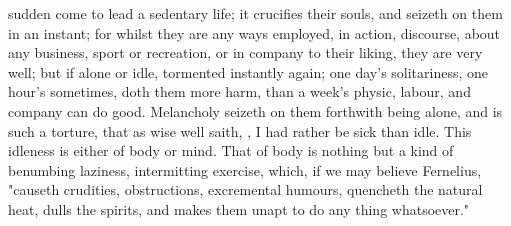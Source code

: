 sudden come to lead a sedentary life; it crucifies their souls, and seizeth on
them in an instant; for whilst they are any ways employed, in action,
discourse, about any business, sport or recreation, or in company to their
liking, they are very well; but if alone or idle, tormented instantly again;
one day's solitariness, one hour's sometimes, doth them more harm, than a
week's physic, labour, and company can do good. Melancholy seizeth on them
forthwith being alone, and is such a torture, that as wise \Seneca{} well saith,
, I had rather be sick than idle. This
idleness is either of body or mind. That of body is nothing but a kind of
benumbing laziness, intermitting exercise, which, if we may believe
Fernelius, "causeth crudities, obstructions, excremental
humours, quencheth the natural heat, dulls the spirits, and makes them unapt to
do any thing whatsoever."



